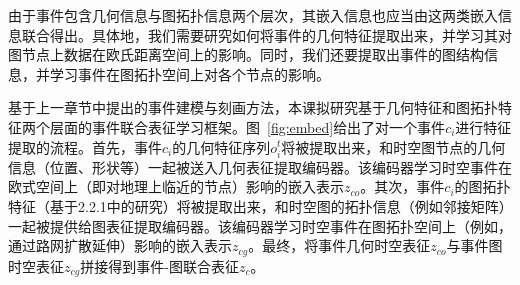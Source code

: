 \documentclass[12pt,UTF8,AutoFakeBold=2,a4paper]{ctexart} %
\begin{document}
由于事件包含几何信息与图拓扑信息两个层次，其嵌入信息也应当由这两类嵌入信息联合得出。具体地，我们需要研究如何将事件的几何特征提取出来，并学习其对图节点上数据在欧氏距离空间上的影响。同时，我们还要提取出事件的图结构信息，并学习事件在图拓扑空间上对各个节点的影响。%

基于上一章节中提出的事件建模与刻画方法，本课拟研究基于几何特征和图拓扑特征两个层面的事件联合表征学习框架。图~\ref{fig:embed}给出了对一个事件$c_i$进行特征提取的流程。首先，事件$c_i$的几何特征序列$o^t_i$将被提取出来，和时空图节点的几何信息（位置、形状等）一起被送入几何表征提取编码器。该编码器学习时空事件在欧式空间上（即对地理上临近的节点）影响的嵌入表示$z_{co}$。其次，事件$c_i$的图拓扑特征（基于2.2.1中的研究）将被提取出来，和时空图的拓扑信息（例如邻接矩阵）一起被提供给图表征提取编码器。该编码器学习时空事件在图拓扑空间上（例如，通过路网扩散延伸）影响的嵌入表示$z_{cg}$。最终，将事件几何时空表征$z_{co}$与事件图时空表征$z_{cg}$拼接得到事件-图联合表征$z_{c}$。
\end{document}
